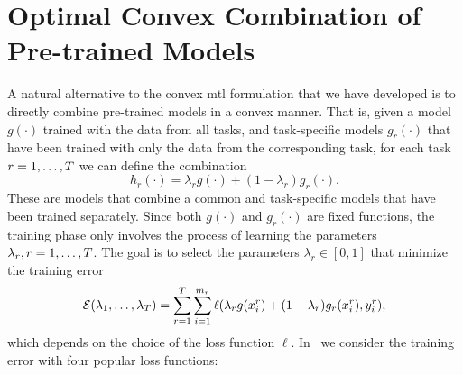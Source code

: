 \section{Optimal Convex Combination of Pre-trained Models}\label{sec:optimal_comb}
A natural alternative to the convex \acrshort{mtl} formulation that we have developed is to directly combine pre-trained models in a convex manner. That is, given a model $g(\cdot)$ trained with the data from all tasks, and task-specific models $g_r(\cdot)$ that have been trained with only the data from the corresponding task, for each task $r=1,\ldots,T$ we can define the combination
\begin{equation}
    \nonumber
    h_r(\cdot) = \lambda_r g(\cdot) + (1 - \lambda_r) g_r(\cdot) .
\end{equation}
These are models that combine a common and task-specific models that have been trained separately. Since both $g(\cdot)$ and $g_r(\cdot)$ are fixed functions, the training phase only involves the process of learning the parameters $\lambda_r, r=1, \ldots, T$. The goal is to select the parameters $\lambda_r \in [0, 1]$ that minimize the training error
\begin{equation}
    \nonumber
    \mathcal{E}(\lambda_1, \ldots, \lambda_T) = \sum_{r=1}^T \sum_{i=1}^{m_r} \ell(\lambda_r g(x_i^r) + (1 - \lambda_r) g_r(x_i^r), y_i^r) ,
\end{equation}
which depends on the choice of the loss function $\ell$. 
In~\cite{RuizAD21} we consider the training error with four popular loss functions:
